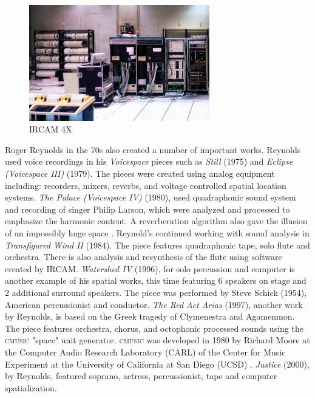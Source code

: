 \begin{figure}[ht!]%
\centering
\includegraphics[width=0.7\textwidth]{img/ircam-4x.jpg} 
\caption{IRCAM 4X \cite{FileIRCA45online}}
\end{figure}


Roger Reynolds in the 70s also created a number of important works. Reynolds used voice recordings in his \textit{Voicespace} pieces such as \textit{Still} (1975) and \textit{Eclipse (Voicespace III)} (1979). The pieces were created using analog equipment including: recorders, mixers, reverbs, and voltage controlled spatial location systems. \textit{The Palace (Voicespace IV)} (1980), used quadraphonic sound system and recording of singer Philip Larson, which were analyzed and processed to emphasize the harmonic content. A reverberation algorithm also gave the illusion of an impossibly huge space \cite{zvonar1999history}. Reynold's continued working with sound analysis in \textit{Transfigured Wind II} (1984). The piece features quadraphonic tape, solo flute and orchestra. There is also analysis and resynthesis of the flute using software created by IRCAM. \textit{Watershed IV} (1996), for solo percussion and computer is another example of his spatial works, this time featuring 6 speakers on stage and 2 additional surround speakers. The piece was performed by Steve Schick (1954), American percussionist and conductor. \textit{The Red Act Arias} (1997), another work by Reynolds, is based on the Greek tragedy of Clymenestra and Agamemnon. The piece features orchestra, chorus, and octophonic processed sounds using the \textsc{cmusic} "space" unit generator. \textsc{cmusic} was developed in 1980 by Richard Moore at the Computer Audio Research Laboratory (CARL) of the Center for Music Experiment at the University of California at San Diego (UCSD) \cite{moore1982computer}. \textit{Justice} (2000), by Reynolds, featured soprano, actress, percussionist, tape and computer spatialization. 

